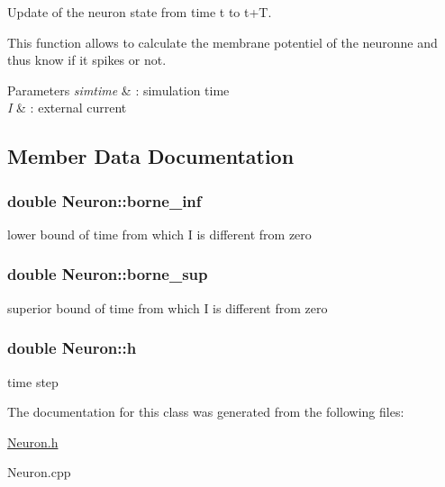 Update of the neuron state from time t to t+\-T. 

This function allows to calculate the membrane potentiel of the neuronne and thus know if it spikes or not.


\begin{DoxyParams}{Parameters}
{\em simtime} & \-: simulation time \\
\hline
{\em I} & \-: external current \\
\hline
\end{DoxyParams}


\subsection{Member Data Documentation}
\hypertarget{classNeuron_ae90ea57c6d9559c8adeb5c46ee6778e1}{
\subsubsection[{borne\-\_\-inf}]{\setlength{\rightskip}{0pt plus 5cm}double Neuron\-::borne\-\_\-inf}}\label{classNeuron_ae90ea57c6d9559c8adeb5c46ee6778e1}
lower bound of time from which I is different from zero \hypertarget{classNeuron_af8db865bd7e1f841035fbd99c821dbed}{
\subsubsection[{borne\-\_\-sup}]{\setlength{\rightskip}{0pt plus 5cm}double Neuron\-::borne\-\_\-sup}}\label{classNeuron_af8db865bd7e1f841035fbd99c821dbed}
superior bound of time from which I is different from zero \hypertarget{classNeuron_ae540cc540666b20457f914d7116eea24}{
\subsubsection[{h}]{\setlength{\rightskip}{0pt plus 5cm}double Neuron\-::h}}\label{classNeuron_ae540cc540666b20457f914d7116eea24}
time step 

The documentation for this class was generated from the following files\-:\begin{DoxyCompactItemize}
\item 
\hyperlink{Neuron_8h}{Neuron.\-h}\item 
Neuron.\-cpp\end{DoxyCompactItemize}
